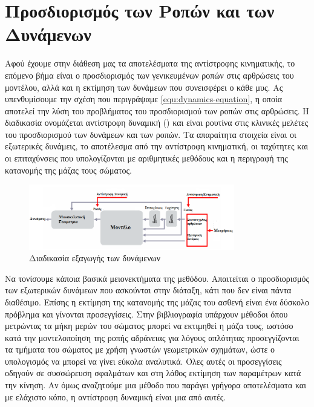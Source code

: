 \section{Προσδιορισμός των Ροπών και των Δυνάμενων}

Αφού έχουμε στην διάθεση μας τα αποτελέσματα της αντίστροφης κινηματικής, το επόμενο βήμα είναι ο προσδιορισμός των γενικευμένων ροπών στις αρθρώσεις του μοντέλου, αλλά και η εκτίμηση των δυνάμεων που συνεισφέρει ο κάθε μυς. Ας υπενθυμίσουμε την σχέση που περιγράψαμε \ref{equ:dynamics-equation}, η οποία αποτελεί την λύση του προβλήματος του προσδιορισμού των ροπών στις αρθρώσεις. Η διαδικασία ονομάζεται αντίστροφη δυναμική () και είναι ρουτίνα στις κλινικές μελέτες του προσδιορισμού των δυνάμεων και των ροπών. Τα απαραίτητα στοιχεία είναι οι εξωτερικές δυνάμεις, το αποτέλεσμα από την αντίστροφη κινηματική, οι ταχύτητες και οι επιταχύνσεις που υπολογίζονται με αριθμητικές μεθόδους και η περιγραφή της κατανομής της μάζας τους σώματος.

\begin{figure}[H]
    \centering
    \includegraphics[width=0.8\textwidth, keepaspectratio]{fig/process.png}
    \caption{Διαδικασία εξαγωγής των δυνάμενων\protect\footnotemark}
    \label{fig:methods-process1}
\end{figure}

Να τονίσουμε κάποια βασικά μειονεκτήματα της μεθόδου. Απαιτείται ο προσδιορισμός των εξωτερικών δυνάμεων που ασκούνται στην διάταξη, κάτι που δεν είναι πάντα διαθέσιμο. Επίσης η εκτίμηση της κατανομής της μάζας του ασθενή είναι ένα δύσκολο πρόβλημα και γίνονται προσεγγίσεις. Στην βιβλιογραφία υπάρχουν μέθοδοι όπου μετρώντας τα μήκη μερών του σώματος μπορεί να εκτιμηθεί η μάζα τους, ωστόσο κατά την μοντελοποίηση της ροπής αδράνειας για λόγους απλότητας προσεγγίζονται τα τμήματα του σώματος με χρήση γνωστών γεωμετρικών σχημάτων, ώστε ο υπολογισμός να μπορεί να γίνει εύκολα αναλυτικά. Όλες αυτές οι προσεγγίσεις οδηγούν σε συσσώρευση σφαλμάτων και στη λάθος εκτίμηση των παραμέτρων κατά την κίνηση. Αν όμως αναζητούμε μια μέθοδο που παράγει γρήγορα αποτελέσματα και με ελάχιστο κόπο, η αντίστροφη δυναμική είναι μια από αυτές.

